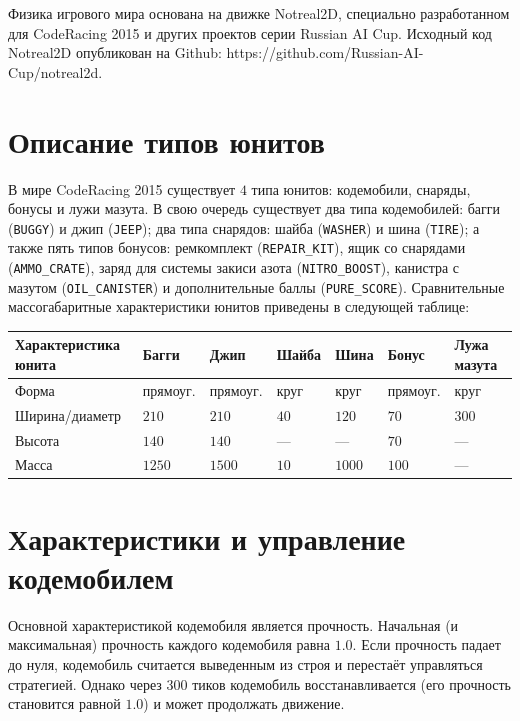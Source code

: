 Физика игрового мира основана на движке Notreal2D, специально разработанном для CodeRacing 2015 и других проектов серии Russian AI Cup.
Исходный код Notreal2D опубликован на Github: https://github.com/Russian-AI-Cup/notreal2d.

\section{Описание типов юнитов}

В мире CodeRacing 2015 существует $4$ типа юнитов: кодемобили, снаряды, бонусы и лужи мазута. В свою очередь существует два типа
кодемобилей: багги (\texttt{BUGGY}) и джип (\texttt{JEEP}); два типа снарядов: шайба (\texttt{WASHER}) и шина (\texttt{TIRE}); а также пять
типов бонусов: ремкомплект (\texttt{REPAIR\_KIT}), ящик со снарядами (\texttt{AMMO\_CRATE}), заряд для системы закиси азота
(\texttt{NITRO\_BOOST}), канистра с мазутом (\texttt{OIL\_CANISTER}) и дополнительные баллы (\texttt{PURE\_SCORE}). Сравнительные
массогабаритные характеристики юнитов приведены в следующей таблице:

\begin{tabular}{| l | l | l | l | l | l | l |}
  \hline
  Характеристика юнита & Багги    & Джип     & Шайба & Шина   & Бонус    & Лужа мазута \\
  \hline
  Форма                & прямоуг. & прямоуг. & круг  & круг   & прямоуг. & круг        \\
  Ширина/диаметр       & $210$    & $210$    & $40$  & $120$  & $70$     & $300$       \\
  Высота               & $140$    & $140$    & ---   & ---    & $70$     & ---         \\
  Масса                & $1250$   & $1500$   & $10$  & $1000$ & $100$    & ---         \\
  \hline
\end{tabular}

\section{Характеристики и управление кодемобилем}

Основной характеристикой кодемобиля является прочность. Начальная (и максимальная) прочность каждого кодемобиля равна $1.0$. Если прочность
падает до нуля, кодемобиль считается выведенным из строя и перестаёт управляться стратегией. Однако через $300$ тиков кодемобиль
восстанавливается (его прочность становится равной $1.0$) и может продолжать движение.

